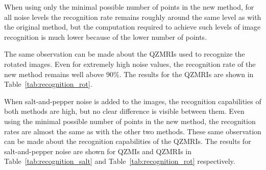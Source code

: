 When using only the minimal possible number of points in the new method, for all noise levels the recognition rate remains roughly around the same level as with the original method, but the computation required to achieve such levels of image recognition is much lower because of the lower number of points.

The same observation can be made about the QZMRIs used to recognize the rotated images. Even for extremely high noise values, the recognition rate of the new method remains well above 90\%. The results for the QZMRIs are shown in Table~\ref{tab:recognition_rot}.


When salt-and-pepper noise is added to the images, the recognition capabilities of both methods are high, but no clear difference is visible between them. Even using the minimal possible number of points in the new method, the recognition rates are almost the same as with the other two methods. 
These same observation can be made about the recognition capabilities of the QZMRIs.
The results for salt-and-pepper noise are shown for QZMIs and QZMRIs in Table~\ref{tab:recognition_salt} and Table~\ref{tab:recognition_rot} respectively.

